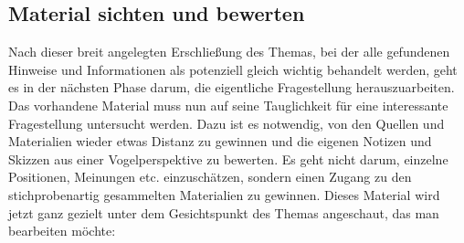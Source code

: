 \documentclass[]{book}
\theoremstyle{definition}
\theoremstyle{definition}
\theoremstyle{definition}
\theoremstyle{remark}
\begin{document}
\subsection{Material sichten und
bewerten}\label{material-sichten-und-bewerten}

Nach dieser breit angelegten Erschließung des Themas, bei der alle
gefundenen Hinweise und Informationen als potenziell gleich wichtig
behandelt werden, geht es in der nächsten Phase darum, die eigentliche
Fragestellung herauszuarbeiten. Das vorhandene Material muss nun auf
seine Tauglichkeit für eine interessante Fragestellung untersucht
werden. Dazu ist es notwendig, von den Quellen und Materialien wieder
etwas Distanz zu gewinnen und die eigenen Notizen und Skizzen aus einer
Vogelperspektive zu bewerten. Es geht nicht darum, einzelne Positionen,
Meinungen etc. einzuschätzen, sondern einen Zugang zu den
stichprobenartig gesammelten Materialien zu gewinnen. Dieses Material
wird jetzt ganz gezielt unter dem Gesichtspunkt des Themas angeschaut,
das man bearbeiten möchte:
\end{document}
